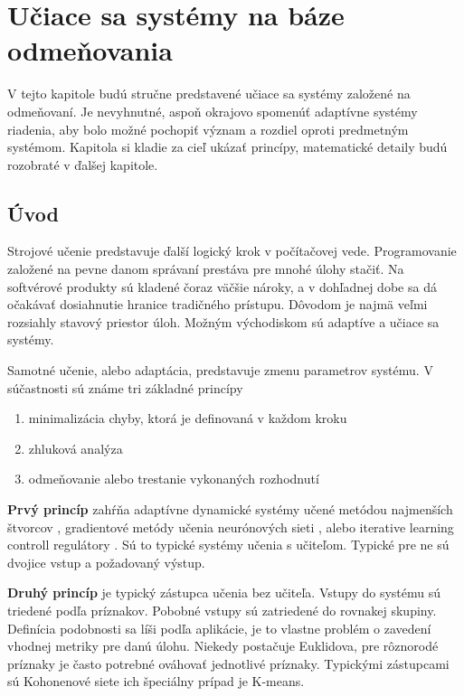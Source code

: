 \chapter{Učiace sa systémy na báze odmeňovania}

V tejto kapitole budú stručne predstavené učiace sa systémy založené na odmeňovaní.
Je nevyhnutné, aspoň okrajovo spomenúť adaptívne systémy riadenia, aby bolo možné
pochopiť význam a rozdiel oproti predmetným systémom. Kapitola si kladie za cieľ
ukázať princípy, matematické detaily budú rozobraté v ďalšej kapitole.
 

\section{Úvod}

Strojové učenie predstavuje ďalší logický krok v počítačovej vede. Programovanie
založené na pevne danom správaní prestáva pre mnohé úlohy stačiť. Na softvérové
produkty sú kladené čoraz väčšie nároky, a v dohľadnej dobe sa dá očakávať
dosiahnutie hranice tradičného prístupu. Dôvodom je najmä veľmi rozsiahly stavový
priestor úloh. Možným východiskom sú adaptíve a učiace sa systémy.

Samotné učenie, alebo adaptácia, predstavuje zmenu parametrov systému.
V súčastnosti sú známe tri základné princípy

\begin{enumerate}
\item minimalizácia chyby, ktorá je definovaná v každom kroku
\item zhluková analýza
\item odmeňovanie alebo trestanie vykonaných rozhodnutí
\end{enumerate}

{\bf Prvý princíp} zahŕňa adaptívne dynamické systémy učené metódou najmenších
štvorcov \cite{bib:adaptive_01} \cite{bib:adaptive_02} \cite{bib:adaptive_03},
gradientové metódy učenia neurónových sieti \cite{bib:gradient_01} \cite{bib:gradient_02}
\cite{bib:gradient_03} \cite{bib:backpropagation_00} \cite{bib:gradient_04}, alebo
iterative learning controll regulátory \cite{bib:ilc_01} \cite{bib:ilc_02}.
Sú to typické systémy učenia s učiteľom. Typické pre ne sú dvojice vstup a požadovaný
výstup.

{\bf Druhý princíp} je typický zástupca učenia bez učiteľa. Vstupy do systému
sú triedené podľa príznakov. Pobobné vstupy sú zatriedené do rovnakej skupiny.
Definícia podobnosti sa líši podľa aplikácie, je to vlastne problém o zavedení vhodnej metriky
pre danú úlohu. Niekedy postačuje Euklidova, pre rôznorodé príznaky je často
potrebné ováhovať jednotlivé príznaky. Typickými zástupcami
sú Kohonenové siete \cite{bib:kohonen_01} \cite{bib:kohonen_02} \cite{bib:kohonen_03} ich špeciálny prípad je K-means.

